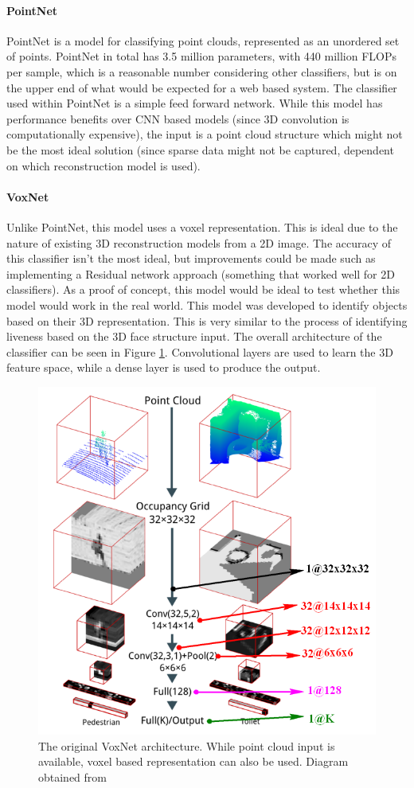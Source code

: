 \documentclass[10pt,a4paper]{article}
\begin{document}
            \paragraph{PointNet}
                PointNet is a model for classifying point clouds, represented as an unordered set of points. PointNet in total has 3.5 million parameters, with 440 million FLOPs per sample, which 
                is a reasonable number considering other classifiers, but is on the upper end of what would be expected for a web based system. The classifier used within PointNet is a simple feed forward network.
                \cite{PointNet}
                While this model has performance benefits over CNN based models (since 3D convolution is computationally expensive),
                the input is a point cloud structure which might not be the most ideal solution (since sparse data might not be captured, dependent on which reconstruction model is used).
                
            \paragraph{VoxNet}
                Unlike PointNet, this model uses a voxel representation. This is ideal due to the nature of existing 3D reconstruction models from a 2D image. The accuracy of this classifier isn't the most ideal,
                but improvements could be made such as implementing a Residual network approach (something that worked well for 2D classifiers). As a proof of concept, this model would be ideal to test whether this model would work
                in the real world. This model was developed to identify objects based on their 3D representation.\cite{VoxNetModel} This is very similar to the process of identifying liveness based on the 3D face structure input.
                The overall architecture of the classifier can be seen in Figure \ref{OriginalVoxNetArchitecture}. Convolutional layers are used to learn the 3D feature space, while a dense layer is used to produce the output. 
                \begin{figure}[]
                    \centering
                    \includegraphics[width=0.5\linewidth]{VoxNetArchitecture.png}
                    \caption{The original VoxNet architecture. While point cloud input is available, voxel based representation can also be used. Diagram obtained from \cite{VoxNetModel}}
                    \label{OriginalVoxNetArchitecture}
                \end{figure}
\end{document}
